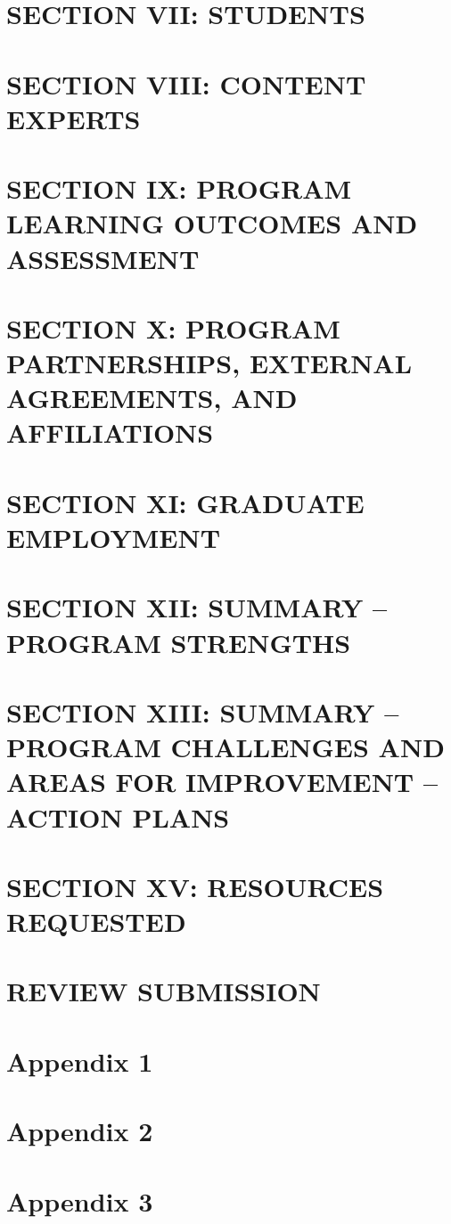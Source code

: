 \documentclass[12pt,a4paper,man,natbib,donotrepeattitle, book]{apa6}
\begin{document}
\section{SECTION VII: STUDENTS}
%

\section{SECTION VIII: CONTENT EXPERTS}
%

\section{SECTION IX: PROGRAM LEARNING OUTCOMES AND ASSESSMENT}
%

\section{SECTION X: PROGRAM PARTNERSHIPS, EXTERNAL AGREEMENTS, AND AFFILIATIONS}
%

\section{SECTION XI: GRADUATE EMPLOYMENT}
%

\section{SECTION XII: SUMMARY – PROGRAM STRENGTHS}
%

\section{SECTION XIII: SUMMARY – PROGRAM CHALLENGES AND AREAS FOR IMPROVEMENT – ACTION PLANS}
%

\section{SECTION XV: RESOURCES REQUESTED}
%

\section{REVIEW SUBMISSION}
%

\section{Appendix 1}
%

\section{Appendix 2}
%

\section{Appendix 3}
%
\end{document}
